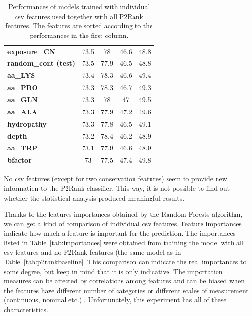 \begin{table}[]
{\begin{tabular}{lcccc}
\textbf{exposure\_CN}         & 73.5           & 78                 & 46.6           & 48.8               \\
\textbf{random\_cont (test)}         & 73.5           & 77.9               & 46.5           & 48.8               \\
\textbf{aa\_LYS}              & 73.4           & 78.3               & 46.6           & 49.4               \\
\textbf{aa\_PRO}              & 73.3           & 78.3               & 46.7           & 49.3               \\
\textbf{aa\_GLN}              & 73.3           & 78                 & 47             & 49.5               \\
\textbf{aa\_ALA}              & 73.3           & 77.9               & 47.2           & 49.6               \\
\textbf{hydropathy}           & 73.3           & 77.8               & 46.5           & 49.1               \\
\textbf{depth}                & 73.2           & 78.4               & 46.2           & 48.9               \\
\textbf{aa\_TRP}              & 73.1           & 77.9               & 46.6           & 48.9               \\
\textbf{bfactor}              & 73             & 77.5               & 47.4           & 49.8               \\ \hline
\end{tabular}
}
\caption{Performances of models trained with individual csv features used together with all P2Rank features. The features are sorted according to the performances in the first column.}
\label{tab:p2rankCSV}
\end{table}

No csv features (except for two conservation features) seem to provide new information to the P2Rank classifier. This way, it is not possible to find out whether the statistical analysis produced meaningful results.

Thanks to the features importances obtained by the Random Forests algorithm, we can get a kind of comparison of individual csv features. Feature importances indicate how much a feature is important for the prediction. The importances listed in Table~\ref{tab:importances} were obtained from training the model with all csv features and no P2Rank features (the same model as in Table~\ref{tab:p2rankbaseline}. This comparison can indicate the real importances to some degree, but keep in mind that it is only indicative. The importation measures can be affected by correlations among features \cite{variableimportance} and can be biased when the features have different number of categories or different scales of measurement (continuous, nominal etc.)  \cite{bias_importance}. Unfortunately, this experiment has all of these characteristics.

